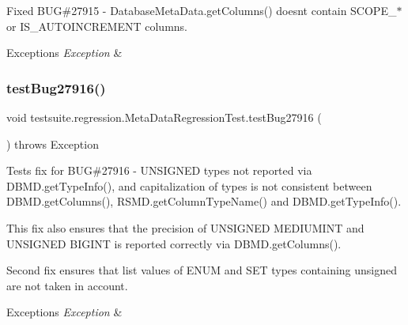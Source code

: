 Fixed B\+UG\#27915 -\/ Database\+Meta\+Data.\+get\+Columns() doesn\textquotesingle{}t contain S\+C\+O\+P\+E\+\_\+$\ast$ or I\+S\+\_\+\+A\+U\+T\+O\+I\+N\+C\+R\+E\+M\+E\+NT columns.


\begin{DoxyExceptions}{Exceptions}
{\em Exception} & \\
\hline
\end{DoxyExceptions}
\mbox{\label{classtestsuite_1_1regression_1_1_meta_data_regression_test_a360ac39f54be19d70c9d43f584bc6f0f}} 
\subsubsection{\texorpdfstring{test\+Bug27916()}{testBug27916()}}
{\footnotesize\ttfamily void testsuite.\+regression.\+Meta\+Data\+Regression\+Test.\+test\+Bug27916 (\begin{DoxyParamCaption}{ }\end{DoxyParamCaption}) throws Exception}

Tests fix for B\+UG\#27916 -\/ U\+N\+S\+I\+G\+N\+ED types not reported via D\+B\+M\+D.\+get\+Type\+Info(), and capitalization of types is not consistent between D\+B\+M\+D.\+get\+Columns(), R\+S\+M\+D.\+get\+Column\+Type\+Name() and D\+B\+M\+D.\+get\+Type\+Info().

This fix also ensures that the precision of U\+N\+S\+I\+G\+N\+ED M\+E\+D\+I\+U\+M\+I\+NT and U\+N\+S\+I\+G\+N\+ED B\+I\+G\+I\+NT is reported correctly via D\+B\+M\+D.\+get\+Columns().

Second fix ensures that list values of E\+N\+UM and S\+ET types containing \textquotesingle{}unsigned\textquotesingle{} are not taken in account.


\begin{DoxyExceptions}{Exceptions}
{\em Exception} & \\
\hline
\end{DoxyExceptions}
\mbox{\label{classtestsuite_1_1regression_1_1_meta_data_regression_test_a37ae44d17afdb072e212dace2d333db9}} 
